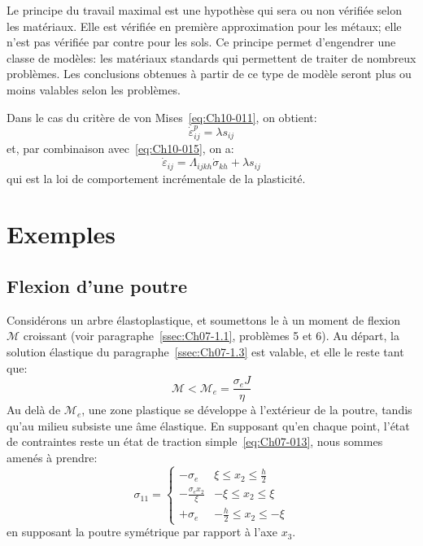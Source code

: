 Le principe du travail maximal est une hypothèse qui sera ou non vérifiée selon les matériaux.
Elle est vérifiée en première approximation pour les métaux; elle n'est pas vérifiée par contre pour les sols.
Ce principe permet d'engendrer une classe de modèles: les matériaux standards qui permettent de traiter de nombreux problèmes.
Les conclusions obtenues à partir de ce type de modèle seront plus ou moins valables selon les problèmes.

Dans le cas du critère de von Mises~\eqref{eq:Ch10-011}, on obtient: 
\begin{equation}
    \dot{\varepsilon}_{ij}^p = \lambda s_{ij}
    \label{eq:Ch10-025}
\end{equation}
et, par combinaison avec~\eqref{eq:Ch10-015}, on a: 
\begin{equation}
    \dot{\varepsilon}_{ij} = \Lambda_{ijkh} \dot{\sigma}_{kh} + \lambda s_{ij}
    \label{eq:Ch10-026}
\end{equation}
qui est la loi de comportement incrémentale de la plasticité. 

\section{Exemples} \label{sec:Ch10-2}
\subsection{Flexion d'une poutre} \label{ssec:Ch10-2.1}
Considérons un arbre élastoplastique, et soumettons le à un moment 
de flexion $\mathcal{M}$ croissant (voir paragraphe~\ref{ssec:Ch07-1.1}, problèmes 5 et 6).
Au départ, la solution élastique du paragraphe~\ref{ssec:Ch07-1.3} est valable, et elle le reste tant que: 
\begin{equation}
    \mathcal{M} < \mathcal{M}_e = \frac{\sigma_e J}{\eta}
    \label{eq:Ch10-027}
\end{equation}
Au delà de $\mathcal{M}_e$, une zone plastique se développe à l'extérieur de la poutre, tandis qu'au milieu subsiste une âme élastique.
En supposant qu'en chaque point, l'état de contraintes reste un état de traction simple~\eqref{eq:Ch07-013}, nous sommes amenés à prendre: 
\begin{equation}
    \sigma_{11} = 
    \begin{cases}
        \displaystyle -\sigma_e & \displaystyle \xi \leq x_2 \leq  \frac{h}{2} \\
        \displaystyle -\frac{\sigma_e x_2}{\xi} & \displaystyle -\xi \leq x_2 \leq \xi \\
        \displaystyle +\sigma_e & \displaystyle -\frac{h}{2} \leq x_2 \leq -\xi
    \end{cases}
    \label{eq:Ch10-028}
\end{equation}
en supposant la poutre symétrique par rapport à l'axe $x_3$.

